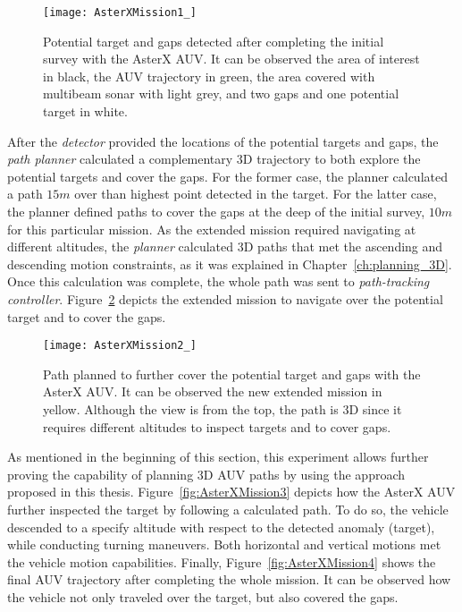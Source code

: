 \begin{figure}[htbp] %
\centering
	\texttt{[image: AsterXMission1\_]}
\caption[Potential target and gaps detected after completing the
initial survey with the AsterX AUV.]
{Potential target and gaps detected after completing the initial survey with the
AsterX AUV. It can be observed the area of interest in black, the AUV trajectory
in green, the area covered with multibeam sonar with light grey, and two gaps
and one potential target in white.}
\label{fig:AsterXMission1}
\end{figure}

After the \textit{detector} provided the locations of the potential targets and
gaps, the \textit{path planner} calculated a complementary \ac{3D} trajectory to
both explore the potential targets and cover the gaps. For the former case, the
planner calculated a path $15m$ over than highest point detected in the
target. For the latter case, the planner defined paths to cover the gaps at the
deep of the initial survey, \ie $10m$ for this particular mission. As the
extended mission required navigating at different altitudes, the \textit{planner}
calculated \ac{3D} paths that met the ascending and descending motion
constraints, as it was explained in Chapter~\ref{ch:planning_3D}. Once this
calculation was complete, the whole path was sent to \textit{path-tracking
controller}. Figure~\ref{fig:AsterXMission2} depicts the extended mission to
navigate over the potential target and to cover the gaps.

\begin{figure}[htbp] %
\centering
	\texttt{[image: AsterXMission2\_]}
\caption[Path planned to further cover the potential target and gaps with the
AsterX AUV.] 
{Path planned to further cover the potential target and gaps with the
AsterX AUV. It can be observed the new extended mission in yellow. Although the
view is from the top, the path is 3D since it requires different altitudes to
inspect targets and to cover gaps.}
\label{fig:AsterXMission2}
\end{figure}

As mentioned in the beginning of this section, this experiment allows further
proving the capability of planning \ac{3D} \ac{AUV} paths by using the approach
proposed in this thesis. Figure~\ref{fig:AsterXMission3} depicts how the AsterX
\ac{AUV} further inspected the target by following a calculated path. To do so,
the vehicle descended to a specify altitude with respect to the detected anomaly
(target), while conducting turning maneuvers. Both horizontal and vertical
motions met the vehicle motion capabilities. Finally,
Figure~\ref{fig:AsterXMission4} shows the final \ac{AUV} trajectory after
completing the whole mission. It can be observed how the vehicle not only
traveled over the target, but also covered the gaps.

